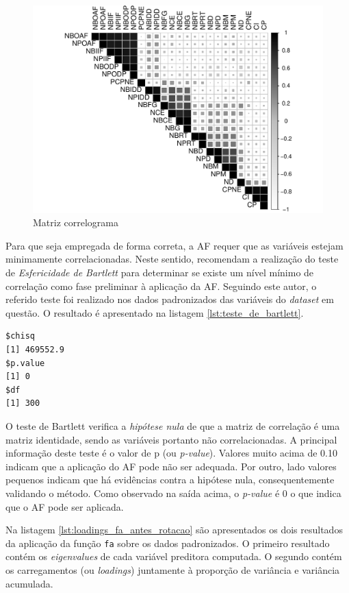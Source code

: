 \begin{figure}[H]
		\centering
		\includegraphics[scale=.75]{../../graficos/latex-graph-matriz-correlacao}
		\caption{Matriz correlograma}
		\label{fig: matriz-correlograma}
\end{figure}

Para que seja empregada de forma correta, a AF requer que as variáveis estejam minimamente correlacionadas. Neste sentido,  recomendam a realização do teste de \textit{Esfericidade de Bartlett} para determinar se existe um nível mínimo de correlação como fase preliminar à aplicação da AF. Seguindo este autor, o referido teste foi realizado nos dados padronizados das variáveis do \textit{dataset} em questão. O resultado é apresentado na listagem \ref{lst:teste_de_bartlett}.
\pagebreak
\begin{lstlisting}[label={lst:teste_de_bartlett}, caption={Teste de Esfericidade de Bartlett}, captionpos=b]
$chisq
[1] 469552.9
$p.value
[1] 0
$df
[1] 300
\end{lstlisting}

O teste de Bartlett verifica a \textit{hipótese nula} de que a matriz de correlação é uma matriz identidade, sendo as variáveis portanto não correlacionadas. A principal informação deste teste é o valor de p (ou \textit{p-value}). Valores muito acima de 0.10 indicam que a aplicação do AF pode não ser adequada. Por outro, lado valores pequenos indicam que há evidências contra a hipótese nula, consequentemente validando o método. Como observado na saída acima, o \textit{p-value} é 0 o que indica que o AF pode ser aplicada.

Na listagem \ref{lst:loadings_fa_antes_rotacao} são apresentados os dois resultados da aplicação da função \lstinline{fa} sobre os dados padronizados. O primeiro resultado contém os \textit{eigenvalues} de cada variável preditora computada. O segundo contém os carregamentos (ou \textit{loadings}) juntamente à proporção de variância e variância acumulada.

